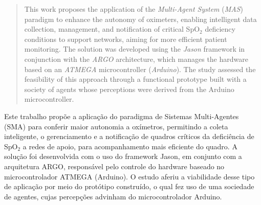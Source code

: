 \begin{abstract}
This work proposes the application of the \textit{Multi-Agent System} (\textit{MAS}) paradigm to enhance the autonomy of oximeters, enabling intelligent data collection, management, and notification of critical SpO$_2$ deficiency conditions to support networks, aiming for more efficient patient monitoring. The solution was developed using the \textit{Jason} framework in conjunction with the \textit{ARGO} architecture, which manages the hardware based on an \textit{ATMEGA} microcontroller (\textit{Arduino}). The study assessed the feasibility of this approach through a functional prototype built with a society of agents whose perceptions were derived from the Arduino microcontroller.
\end{abstract}

\begin{resumo}
Este trabalho propõe a aplicação do paradigma de Sistemas Multi-Agentes (SMA) para conferir maior autonomia a oxímetros, permitindo a coleta inteligente, o gerenciamento e a notificação de quadros críticos da deficiência de SpO$_2$ a redes de apoio, para acompanhamento mais eficiente do quadro. A solução foi desenvolvida com o uso do framework Jason, em conjunto com a arquitetura ARGO, responsável pelo controle do hardware baseado no microcontrolador ATMEGA (Arduino). O estudo aferiu a viabilidade desse tipo de aplicação por meio do protótipo construído, o qual fez uso de uma sociedade de agentes, cujas percepções advinham do microcontrolador Arduino.
\end{resumo}